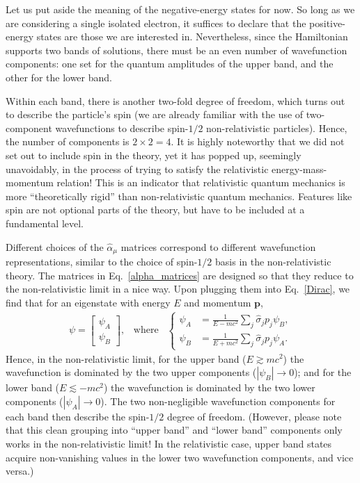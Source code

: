 \documentclass[pra,12pt]{revtex4}
\begin{document}
Let us put aside the meaning of the negative-energy states for now.
So long as we are considering a single isolated electron, it suffices
to declare that the positive-energy states are those we are interested
in.  Nevertheless, since the Hamiltonian supports two bands of
solutions, there must be an even number of wavefunction components:
one set for the quantum amplitudes of the upper band, and the other
for the lower band.

Within each band, there is another two-fold degree of freedom, which
turns out to describe the particle's spin (we are already familiar
with the use of two-component wavefunctions to describe spin-$1/2$
non-relativistic particles).  Hence, the number of components is
$2\times2 = 4$.  It is highly noteworthy that we did not set out to
include spin in the theory, yet it has popped up, seemingly
unavoidably, in the process of trying to satisfy the relativistic
energy-mass-momentum relation!  This is an indicator that relativistic
quantum mechanics is more ``theoretically rigid'' than
non-relativistic quantum mechanics.  Features like spin are not
optional parts of the theory, but have to be included at a fundamental
level.

Different choices of the $\hat{\alpha}_\mu$ matrices correspond to
different wavefunction representations, similar to the choice of
spin-$1/2$ basis in the non-relativistic theory.  The matrices in
Eq.~\eqref{alpha_matrices} are designed so that they reduce to the
non-relativistic limit in a nice way.  Upon plugging them into
Eq.~\eqref{Dirac}, we find that for an eigenstate with energy $E$ and
momentum $\mathbf{p}$,
\begin{align}
  \psi = \begin{bmatrix}\psi_A \\ \psi_B
  \end{bmatrix}, \;\;\;\mathrm{where}\;\;\; \left\{
  \begin{aligned}
    \psi_A &= \frac{1}{E - mc^2} \sum_j \hat{\sigma}_j p_j \psi_B, \\
    \psi_B &= \frac{1}{E + mc^2} \sum_j \hat{\sigma}_j p_j \psi_A.
  \end{aligned}\right.
  \label{dirac_nonrelativistic}
\end{align}
Hence, in the non-relativistic limit, for the upper band ($E \gtrsim
mc^2$) the wavefunction is dominated by the two upper components
($|\psi_B| \rightarrow 0$); and for the lower band ($E \lesssim
-mc^2$) the wavefunction is dominated by the two lower components
($|\psi_A| \rightarrow 0$).  The two non-negligible wavefunction
components for each band then describe the spin-$1/2$ degree of
freedom.  (However, please note that this clean grouping into ``upper
band'' and ``lower band'' components only works in the
non-relativistic limit!  In the relativistic case, upper band states
acquire non-vanishing values in the lower two wavefunction components,
and vice versa.)
\end{document}
